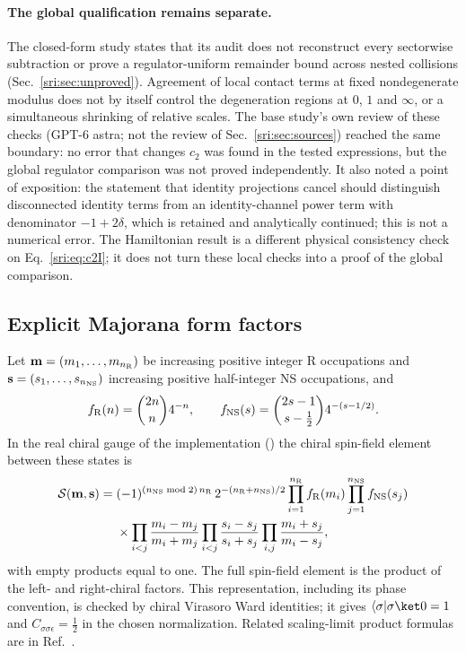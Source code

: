 \paragraph{The global qualification remains separate.} The closed-form study states that its audit does not
reconstruct every sectorwise subtraction or prove a regulator-uniform remainder bound across nested collisions
(Sec.~\ref{sri:sec:unproved}). Agreement of local contact terms at fixed nondegenerate modulus does not by itself control
the degeneration regions at $0$, $1$ and $\infty$, or a simultaneous shrinking of relative scales. The base study's own review of
these checks (GPT-6 astra; not the review of Sec.~\ref{sri:sec:sources}) reached the same boundary: no error that changes $c_2$ was found in the tested expressions, but the global regulator comparison
was not proved independently. It also noted a point of exposition: the statement that identity projections cancel
should distinguish disconnected identity terms from an identity-channel power term with denominator $-1+2\delta$, which
is retained and analytically continued; this is not a numerical error. The Hamiltonian result is a different physical
consistency check on Eq.~\eqref{sri:eq:c2I}; it does not turn these local checks into a proof of the global comparison.

\subsection{Explicit Majorana form factors}\label{sri:app:cyl:formfactors}
Let $\mathbf m=(m_1,\ldots,m_{n_{\rm R}})$ be increasing positive integer R occupations and
$\mathbf s=(s_1,\ldots,s_{n_{\rm NS}})$ increasing positive half-integer NS occupations, and
\begin{equation}
 f_{\rm R}(n)=\binom{2n}{n}4^{-n},\qquad f_{\rm NS}(s)=\binom{2s-1}{s-\frac12}4^{-(s-1/2)}.
\end{equation}
In the real chiral gauge of the implementation () the chiral
spin-field element between these states is
\begin{equation}
\begin{aligned}
 \mathcal S(\mathbf m,\mathbf s)={}&(-1)^{(n_{\rm NS}\bmod2)\,n_{\rm R}}\,2^{-(n_{\rm R}+n_{\rm NS})/2}
 \prod_{i=1}^{n_{\rm R}}f_{\rm R}(m_i)\prod_{j=1}^{n_{\rm NS}}f_{\rm NS}(s_j)\\
 &\times\prod_{i<j}\frac{m_i-m_j}{m_i+m_j}\prod_{i<j}\frac{s_i-s_j}{s_i+s_j}\prod_{i,j}\frac{m_i+s_j}{m_i-s_j},
\end{aligned}
\label{sri:eq:cyl:formfactors}
\end{equation}
with empty products equal to one. The full spin-field element is the product of the left- and right-chiral factors.
This representation, including its phase convention, is checked by chiral Virasoro Ward identities; it gives
$\langle\sigma\rvert\sigma\ket0=1$ and $C_{\sigma\sigma\epsilon}=\frac12$ in the chosen normalization. Related
scaling-limit product formulas are in Ref.~\cite{sri:Liu:2026}.

